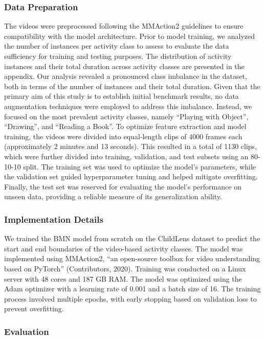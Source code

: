 \documentclass[
  man,floatsintext]{apa6}
\begin{document}
\subsubsection{Data Preparation}\label{data-preparation}

The videos were preprocessed following the MMAction2 guidelines to ensure compatibility with the model architecture. Prior to model training, we analyzed the number of instances per activity class to assess to evaluate the data sufficiency for training and testing purposes. The distribution of activity instances and their total duration across activity classes are presented in the appendix.
Our analysis revealed a pronounced class imbalance in the dataset, both in terms of the number of instances and their total duration. Given that the primary aim of this study is to establish initial benchmark results, no data augmentation techniques were employed to address this imbalance. Instead, we focused on the most prevalent activity classes, namely ``Playing with Object'', ``Drawing'', and ``Reading a Book''. To optimize feature extraction and model training, the videos were divided into equal-length clips of 4000 frames each (approximately 2 minutes and 13 seconds). This resulted in a total of 1130 clips, which were further divided into training, validation, and test subsets using an 80-10-10 split. The training set was used to optimize the model's parameters, while the validation set guided hyperparameter tuning and helped mitigate overfitting. Finally, the test set was reserved for evaluating the model's performance on unseen data, providing a reliable measure of its generalization ability.

\subsubsection{Implementation Details}\label{implementation-details}

We trained the BMN model from scratch on the ChildLens dataset to predict the start and end boundaries of the video-based activity classes. The model was implemented using MMAction2, ``an open-source toolbox for video understanding based on PyTorch'' (Contributors, 2020). Training was conducted on a Linux server with 48 cores and 187 GB RAM. The model was optimized using the Adam optimizer with a learning rate of 0.001 and a batch size of 16. The training process involved multiple epochs, with early stopping based on validation loss to prevent overfitting.

\subsubsection{Evaluation}\label{evaluation}
\end{document}
